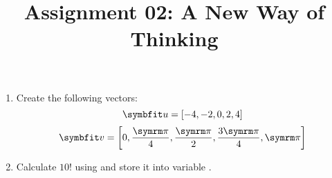 \documentclass{article}
\title{Assignment 02: A New Way of Thinking}
\begin{document}
\renderTitle

\begin{enumerate}[leftmargin=*]
	\item
		Create the following vectors:
		\begin{equation}
			\mat{u}
			=
			[-4, -2, 0, 2, 4]
		\end{equation}
		\begin{equation}
			\mat{v}
			=
			\left[
				0,
				\frac{\cpi}{4},
				\frac{\cpi}{2},
				\frac{3\cpi}{4},
				\cpi
			\right]
		\end{equation}

	\item
		Calculate \(10!\) using  and
		store it into variable .
\end{enumerate}
\end{document}
